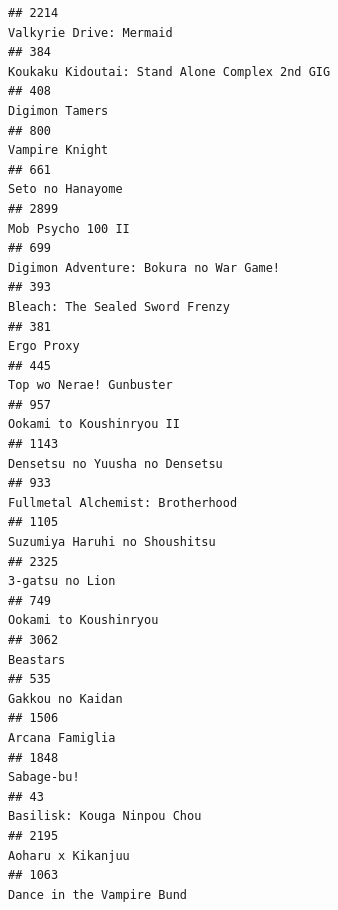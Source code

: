 \documentclass[
]{article}
\begin{document}
\begin{verbatim}
## 2214                                                                                   Valkyrie Drive: Mermaid
## 384                                                              Koukaku Kidoutai: Stand Alone Complex 2nd GIG
## 408                                                                                             Digimon Tamers
## 800                                                                                             Vampire Knight
## 661                                                                                           Seto no Hanayome
## 2899                                                                                         Mob Psycho 100 II
## 699                                                                     Digimon Adventure: Bokura no War Game!
## 393                                                                            Bleach: The Sealed Sword Frenzy
## 381                                                                                                 Ergo Proxy
## 445                                                                                    Top wo Nerae! Gunbuster
## 957                                                                                   Ookami to Koushinryou II
## 1143                                                                            Densetsu no Yuusha no Densetsu
## 933                                                                           Fullmetal Alchemist: Brotherhood
## 1105                                                                             Suzumiya Haruhi no Shoushitsu
## 2325                                                                                           3-gatsu no Lion
## 749                                                                                      Ookami to Koushinryou
## 3062                                                                                                  Beastars
## 535                                                                                           Gakkou no Kaidan
## 1506                                                                                           Arcana Famiglia
## 1848                                                                                                Sabage-bu!
## 43                                                                                 Basilisk: Kouga Ninpou Chou
## 2195                                                                                         Aoharu x Kikanjuu
## 1063                                                                                 Dance in the Vampire Bund

\end{verbatim}
\end{document}

